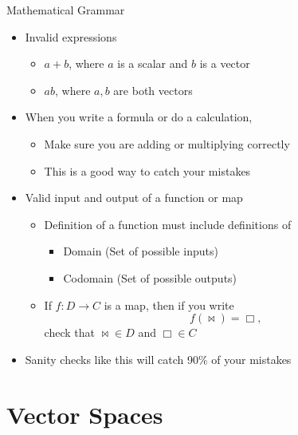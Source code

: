 \documentclass[usenames,dvipsnames,10pt]{beamer}
\begin{document}
\begin{frame}
  {Mathematical Grammar}

  \begin{itemize}
  \item Invalid expressions
    \begin{itemize}
    \item $a+b$, where $a$ is a scalar and $b$ is a vector
    \item $ab$, where $a, b$ are both vectors
    \end{itemize}
  \item When you write a formula or do a calculation,
    \begin{itemize}
    \item Make sure you are adding or multiplying correctly
    \item This is a good way to catch your mistakes
    \end{itemize}
  \item Valid input and output of a function or map
    \begin{itemize}
    \item Definition of a function must include definitions of
      \begin{itemize}
      \item Domain (Set of possible inputs)
      \item Codomain (Set of possible outputs)
      \end{itemize}
    \item If $f: D \rightarrow C$ is a map, then if you write
      \[ f(\bowtie) = \Box, \]
      check that $\bowtie \in D$ and $\Box \in C$
    \end{itemize}
  \item Sanity checks like this will catch 90\% of your mistakes
  \end{itemize}
\end{frame}

\section{Vector Spaces}
\end{document}
